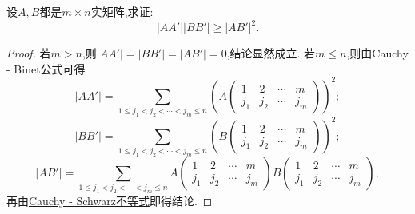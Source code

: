 \documentclass[../../main.tex]{subfiles}
\begin{document}
\begin{example}
设\(A,B\)都是\(m\times n\)实矩阵,求证:
\[
|AA'||BB'|\geq|AB'|^2.
\]
\end{example}
\begin{proof}
若\(m > n\),则\(|AA'| = |BB'| = |AB'| = 0\),结论显然成立.
若\(m\leq n\),则由Cauchy - Binet公式可得
\[
|AA'|=\sum_{1\leq j_1<j_2<\cdots<j_m\leq n}\left(A\begin{pmatrix}
1 & 2 & \cdots & m\\
j_1 & j_2 & \cdots & j_m
\end{pmatrix}\right)^2;
\]
\[
|BB'|=\sum_{1\leq j_1<j_2<\cdots<j_m\leq n}\left(B\begin{pmatrix}
1 & 2 & \cdots & m\\
j_1 & j_2 & \cdots & j_m
\end{pmatrix}\right)^2;
\]
\[
|AB'|=\sum_{1\leq j_1<j_2<\cdots<j_m\leq n}A\begin{pmatrix}
1 & 2 & \cdots & m\\
j_1 & j_2 & \cdots & j_m
\end{pmatrix}B\begin{pmatrix}
1 & 2 & \cdots & m\\
j_1 & j_2 & \cdots & j_m
\end{pmatrix},
\]
再由\hyperref[theorem:Cauchy - Schwarz不等式]{Cauchy - Schwarz不等式}即得结论.
\end{proof}
\end{document}
